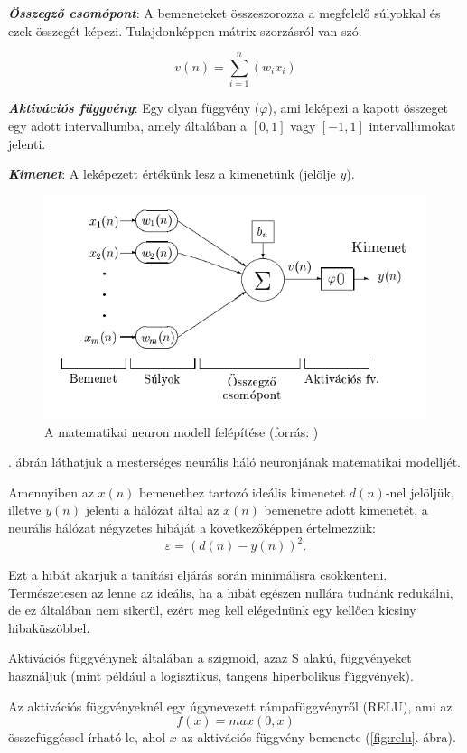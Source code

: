 \textbf{\textit{Összegző csomópont}}: A bemeneteket összeszorozza a megfelelő súlyokkal és ezek összegét képezi. Tulajdonképpen mátrix szorzásról van szó.

$$
v(n) = \sum_{i=1}^{n}(w_ix_i)
$$

\textit{\textbf{Aktivációs függvény}}: Egy olyan függvény ($\varphi$), ami leképezi a kapott összeget egy adott intervallumba, amely általában a $[0, 1]$ vagy $[-1, 1]$ intervallumokat jelenti.

\textbf{\textit{Kimenet}}: A leképezett értékünk lesz a kimenetünk (jelölje $y$).

\begin{figure}[h]
	\centering
	\includegraphics[scale=0.6]{images/ANNParts.png}
	\caption{A matematikai neuron modell felépítése (forrás: \cite{neuralis77})}
	\label{fig:ANNParts}
\end{figure}

. ábrán láthatjuk a mesterséges neurális háló neuronjának matematikai modelljét.

Amennyiben az $x(n)$ bemenethez tartozó ideális kimenetet $d(n)$-nel jelöljük, illetve $y(n)$ jelenti a hálózat által az $x(n)$ bemenetre adott kimenetét, a neurális hálózat négyzetes hibáját a következőképpen értelmezzük:
$$
\varepsilon = (d(n) - y(n))^2.
$$

Ezt a hibát akarjuk a tanítási eljárás során minimálisra csökkenteni. Természetesen az lenne az ideális, ha a hibát egészen nullára tudnánk redukálni, de ez általában nem sikerül, ezért meg kell elégednünk egy kellően kicsiny hibaküszöbbel.

Aktivációs függvénynek általában a szigmoid, azaz S alakú, függvényeket használjuk (mint például a logisztikus, tangens hiperbolikus függvények).

Az aktivációs függvényeknél egy úgynevezett rámpafüggvényről (RELU), ami az
$$
f(x) = max(0,x)
$$
összefüggéssel írható le, ahol $x$ az aktivációs függvény bemenete (\ref{fig:relu}. ábra).

